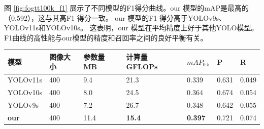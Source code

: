 图 \ref{fig:fogtt100k_f1} 展示了不同模型的F1得分曲线。our 模型的mAP是最高的（0.592），这与其高F1 得分一致。 our 模型的F1 得分高于YOLOv9s、YOLOv11s和YOLOv10s。 这表明，our 模型在平均精度上好于其他YOLO模型。 F1曲线的高性能与our模型的精度和召回率之间的良好平衡有关。 


\begin{table}[H]
    \centering
    \captionsetup{font=footnotesize}
    \label{tab:compare_studies_fogvd}
    \begin{tabular}{p{}p{}p{}p{}p{}p{}p{}}
        \toprule
        模型         & 图像大小 & 参数量 MB & 计算量 GFLOPs  & $mAP_{0.5}$     & P     & R     \\  
        \midrule
        YOLOv11s     & 400     & 9.4   & 21.3          & 0.339           & 0.631  & 0.049 \\
        YOLOv10s     & 400     & 8.0   & 24.5          & 0.364           & 0.674  & 0.054 \\
        YOLOv9s      & 400     & 7.2   & 26.7          & 0.348           & 0.642  & 0.055 \\
        \textbf{our} & 400     & 11.4  & \textbf{15.4} & \textbf{0.397}  & 0.721  & 0.074 \\
        \bottomrule
    \end{tabular}
\end{table}


